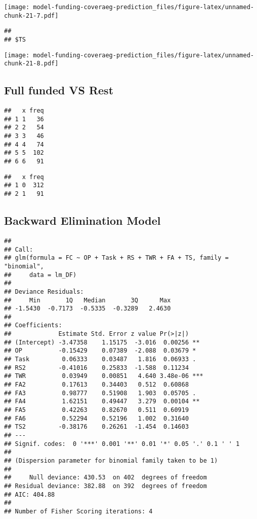 \documentclass[]{article}
\begin{document}
\texttt{[image: model-funding-coveraeg-prediction\_files/figure-latex/unnamed-chunk-21-7.pdf]}

\begin{verbatim}
## 
## $TS
\end{verbatim}

\texttt{[image: model-funding-coveraeg-prediction\_files/figure-latex/unnamed-chunk-21-8.pdf]}

\newpage

\hypertarget{full-funded-vs-rest}{%
\subsection{Full funded VS Rest}\label{full-funded-vs-rest}}

\begin{verbatim}
##   x freq
## 1 1   36
## 2 2   54
## 3 3   46
## 4 4   74
## 5 5  102
## 6 6   91
\end{verbatim}

\begin{verbatim}
##   x freq
## 1 0  312
## 2 1   91
\end{verbatim}

\hypertarget{backward-elimination-model-4}{%
\subsection{Backward Elimination
Model}\label{backward-elimination-model-4}}

\begin{verbatim}
## 
## Call:
## glm(formula = FC ~ OP + Task + RS + TWR + FA + TS, family = "binomial", 
##     data = lm_DF)
## 
## Deviance Residuals: 
##     Min       1Q   Median       3Q      Max  
## -1.5430  -0.7173  -0.5335  -0.3289   2.4630  
## 
## Coefficients:
##             Estimate Std. Error z value Pr(>|z|)    
## (Intercept) -3.47358    1.15175  -3.016  0.00256 ** 
## OP          -0.15429    0.07389  -2.088  0.03679 *  
## Task         0.06333    0.03487   1.816  0.06933 .  
## RS2         -0.41016    0.25833  -1.588  0.11234    
## TWR          0.03949    0.00851   4.640 3.48e-06 ***
## FA2          0.17613    0.34403   0.512  0.60868    
## FA3          0.98777    0.51908   1.903  0.05705 .  
## FA4          1.62151    0.49447   3.279  0.00104 ** 
## FA5          0.42263    0.82670   0.511  0.60919    
## FA6          0.52294    0.52196   1.002  0.31640    
## TS2         -0.38176    0.26261  -1.454  0.14603    
## ---
## Signif. codes:  0 '***' 0.001 '**' 0.01 '*' 0.05 '.' 0.1 ' ' 1
## 
## (Dispersion parameter for binomial family taken to be 1)
## 
##     Null deviance: 430.53  on 402  degrees of freedom
## Residual deviance: 382.88  on 392  degrees of freedom
## AIC: 404.88
## 
## Number of Fisher Scoring iterations: 4
\end{verbatim}
\end{document}
